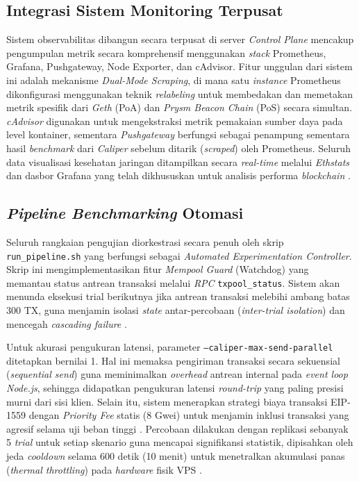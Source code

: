 \subsection{Integrasi Sistem Monitoring Terpusat}
Sistem observabilitas dibangun secara terpusat di server \textit{Control Plane} mencakup pengumpulan metrik secara komprehensif menggunakan \textit{stack} Prometheus, Grafana, Pushgateway, Node Exporter, dan cAdvisor. Fitur unggulan dari sistem ini adalah mekanisme \textit{Dual-Mode Scraping}, di mana satu \textit{instance} Prometheus dikonfigurasi menggunakan teknik \textit{relabeling} untuk membedakan dan memetakan metrik spesifik dari \textit{Geth} (PoA) dan \textit{Prysm Beacon Chain} (PoS) secara simultan. \textit{cAdvisor} digunakan untuk mengekstraksi metrik pemakaian sumber daya pada level kontainer, sementara \textit{Pushgateway} berfungsi sebagai penampung sementara hasil \textit{benchmark} dari \textit{Caliper} sebelum ditarik (\textit{scraped}) oleh Prometheus. Seluruh data visualisasi kesehatan jaringan ditampilkan secara \textit{real-time} melalui \textit{Ethstats} dan dasbor Grafana yang telah dikhususkan untuk analisis performa \textit{blockchain} \cite{Repo-Monitoring}.

\subsection{\textit{Pipeline Benchmarking} Otomasi}
Seluruh rangkaian pengujian diorkestrasi secara penuh oleh skrip \texttt{run\_pipeline.sh} yang berfungsi sebagai \textit{Automated Experimentation Controller}. Skrip ini mengimplementasikan fitur \textit{Mempool Guard} (Watchdog) yang memantau status antrean transaksi melalui \textit{RPC} \texttt{txpool\_status}. Sistem akan menunda eksekusi trial berikutnya jika antrean transaksi melebihi ambang batas 300 TX, guna menjamin isolasi \textit{state} antar-percobaan (\textit{inter-trial isolation}) dan mencegah \textit{cascading failure} \cite{nygard2018}. 

Untuk akurasi pengukuran latensi, parameter \texttt{--caliper-max-send-parallel} ditetapkan bernilai 1. Hal ini memaksa pengiriman transaksi secara sekuensial (\textit{sequential send}) guna meminimalkan \textit{overhead} antrean internal pada \textit{event loop Node.js}, sehingga didapatkan pengukuran latensi \textit{round-trip} yang paling presisi murni dari sisi klien. Selain itu, sistem menerapkan strategi biaya transaksi EIP-1559 dengan \textit{Priority Fee} statis (8 Gwei) untuk menjamin inklusi transaksi yang agresif selama uji beban tinggi \cite{roughgarden2020}. Percobaan dilakukan dengan replikasi sebanyak 5 \textit{trial} untuk setiap skenario guna mencapai signifikansi statistik, dipisahkan oleh jeda \textit{cooldown} selama 600 detik (10 menit) untuk menetralkan akumulasi panas (\textit{thermal throttling}) pada \textit{hardware} fisik VPS \cite{spec2019, Repo-Benchmark-Pipeline}.

